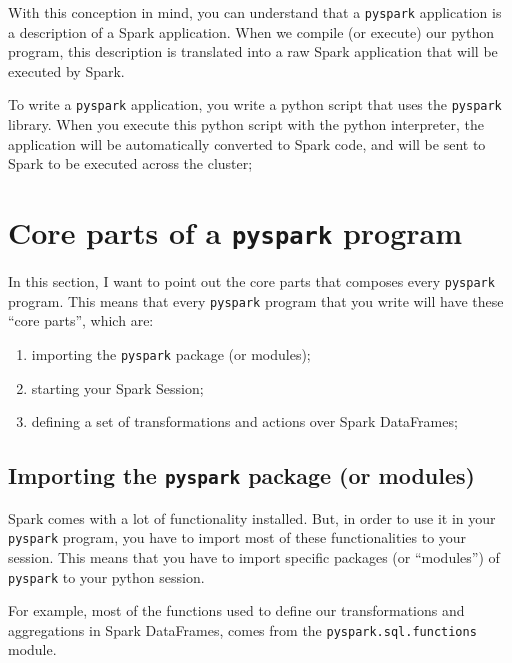 \documentclass[
  11pt,
  letterpaper,
  DIV=11,
  numbers=noendperiod]{scrreprt}
\begin{document}
With this conception in mind, you can understand that a \texttt{pyspark}
application is a description of a Spark application. When we compile (or
execute) our python program, this description is translated into a raw
Spark application that will be executed by Spark.

To write a \texttt{pyspark} application, you write a python script that
uses the \texttt{pyspark} library. When you execute this python script
with the python interpreter, the application will be automatically
converted to Spark code, and will be sent to Spark to be executed across
the cluster;

\section{\texorpdfstring{Core parts of a \texttt{pyspark}
program}{Core parts of a pyspark program}}\label{core-parts-of-a-pyspark-program}

In this section, I want to point out the core parts that composes every
\texttt{pyspark} program. This means that every \texttt{pyspark} program
that you write will have these ``core parts'', which are:

\begin{enumerate}
\def\labelenumi{\arabic{enumi})}
\item
  importing the \texttt{pyspark} package (or modules);
\item
  starting your Spark Session;
\item
  defining a set of transformations and actions over Spark DataFrames;
\end{enumerate}

\subsection{\texorpdfstring{Importing the \texttt{pyspark} package (or
modules)}{Importing the pyspark package (or modules)}}\label{importing-the-pyspark-package-or-modules}

Spark comes with a lot of functionality installed. But, in order to use
it in your \texttt{pyspark} program, you have to import most of these
functionalities to your session. This means that you have to import
specific packages (or ``modules'') of \texttt{pyspark} to your python
session.

For example, most of the functions used to define our transformations
and aggregations in Spark DataFrames, comes from the
\texttt{pyspark.sql.functions} module.
\end{document}
